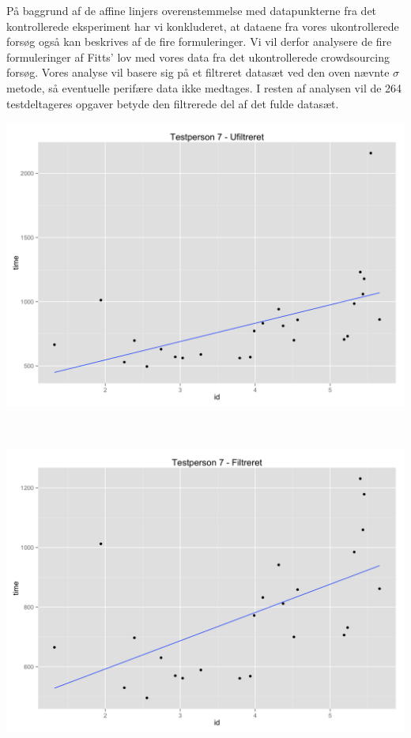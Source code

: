 \newpage
På baggrund af de affine linjers overenstemmelse med datapunkterne fra det kontrollerede eksperiment har vi konkluderet, at dataene fra vores ukontrollerede forsøg også kan beskrives af de fire formuleringer. Vi vil derfor analysere de fire formuleringer af Fitts' lov med vores data fra det ukontrollerede crowdsourcing forsøg. Vores analyse vil basere sig på et filtreret datasæt ved den oven nævnte $\sigma$ metode, så eventuelle perifære data ikke medtages. I resten af analysen vil de 264 testdeltageres opgaver betyde den filtrerede del af det fulde datasæt.

\begin{minipage}{\linewidth}
	\begin{minipage}[t]{0.45\linewidth}
		\includegraphics[width=\textwidth]{images/plots/plot_model_test_comparison_unfiltered}
		\label{fig:testdeltager7unfilter}
	\end{minipage}
	\begin{minipage}[b]{0.1\linewidth}
	~
	\end{minipage}
	\begin{minipage}[t]{.45\linewidth}
		\includegraphics[width=\textwidth]{images/plots/plot_model_test_comparison_filtered}
		\label{fig:testdeltager7filter}
	\end{minipage}
\end{minipage}

